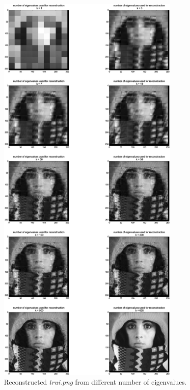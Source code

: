 \documentclass[a4paper,12px]{article}
\begin{document}
\begin{figure}[!h]
    \centering
    \includegraphics[width=0.8\textwidth]{montage.png}
    \caption{Reconstructed \textit{trui.png} from different number of eigenvalues.}
    \label{fig:structures}
\end{figure}
\FloatBarrier


% 
% 
\end{document}
